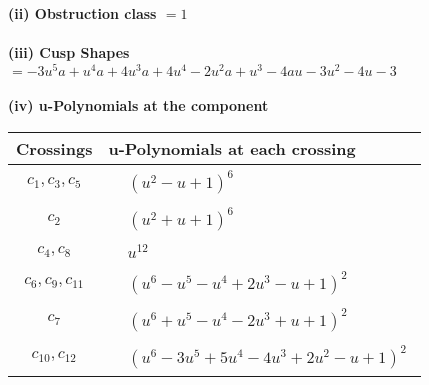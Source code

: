 \documentclass[1p]{elsarticle_modified}
\theoremstyle{definition}
\begin{document}
\flushleft \textbf{(ii) Obstruction class $= 1$}\\~\\
\flushleft \textbf{(iii) Cusp Shapes $= -3 u^5 a+u^4 a+4 u^3 a+4 u^4-2 u^2 a+u^3-4 a u-3 u^2-4 u-3$}\\~\\
\newpage\renewcommand{\arraystretch}{1}
\flushleft \textbf{(iv) u-Polynomials at the component}\newline \\
\begin{tabular}{m{50pt}|m{274pt}}
Crossings & \hspace{64pt}u-Polynomials at each crossing \\
\hline $$\begin{aligned}c_{1},c_{3},c_{5}\end{aligned}$$&$\begin{aligned}
&(u^2- u+1)^6
\end{aligned}$\\
\hline $$\begin{aligned}c_{2}\end{aligned}$$&$\begin{aligned}
&(u^2+u+1)^6
\end{aligned}$\\
\hline $$\begin{aligned}c_{4},c_{8}\end{aligned}$$&$\begin{aligned}
&u^{12}
\end{aligned}$\\
\hline $$\begin{aligned}c_{6},c_{9},c_{11}\end{aligned}$$&$\begin{aligned}
&(u^6- u^5- u^4+2 u^3- u+1)^2
\end{aligned}$\\
\hline $$\begin{aligned}c_{7}\end{aligned}$$&$\begin{aligned}
&(u^6+u^5- u^4-2 u^3+u+1)^2
\end{aligned}$\\
\hline $$\begin{aligned}c_{10},c_{12}\end{aligned}$$&$\begin{aligned}
&(u^6-3 u^5+5 u^4-4 u^3+2 u^2- u+1)^2
\end{aligned}$\\
\hline
\end{tabular}\\~\\
\end{document}
